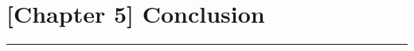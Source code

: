 \documentclass[runningheads]{llncs}
\begin{document}
\chapter{[Chapter 5] Conclusion}



\noindent\rule{12cm}{0.4pt}
\end{document}
